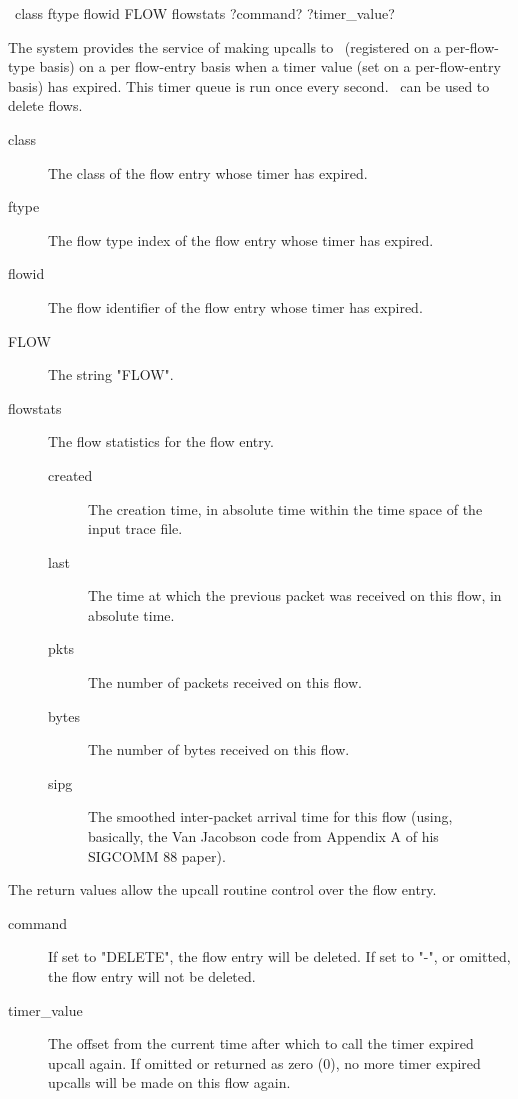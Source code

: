 \documentclass{article}
\begin{document}
\manend


\SYNOPSIS \cmdname\ class ftype flowid FLOW flowstats
\RETURNVALUES ?command? ?timer\_value?

The system provides the service of making upcalls to \cmdname\
(registered on a per-flow-type basis) on a per flow-entry basis when a
timer value (set on a per-flow-entry basis) has expired.  This timer
queue is run once every second.  \cmdname\ can be used to delete flows.

\begin{description}
\item[class] The class of the flow entry whose timer has expired.
\item[ftype] The flow type index of the flow entry whose timer has
expired.
\item[flowid] The flow identifier of the flow entry whose timer has
expired.
\item[FLOW] The string "FLOW".
\item[flowstats] The flow statistics for the flow entry.
\begin{description}
\item[created] The creation time, in absolute time within the time
space of the input trace file.
\item[last] The time at which the previous packet was received on this
flow, in absolute time.
\item[pkts] The number of packets received on this flow.
\item[bytes] The number of bytes received on this flow.
\item[sipg] The smoothed inter-packet arrival time for this flow
(using, basically,
the Van Jacobson code from Appendix A of his SIGCOMM 88 paper).
\end{description}
\end{description}

The return values allow the upcall routine control over the flow entry.

\begin{description}
\item[command] If set to "DELETE", the flow entry will be deleted.  If
set to "-", or omitted, the flow entry will not be deleted.
\item[timer\_value] The offset from the current time after which to call
the timer expired upcall again.  If omitted or returned as zero (0), no
more timer expired upcalls will be made on this flow again.
\end{description}


\manend
\end{document}
